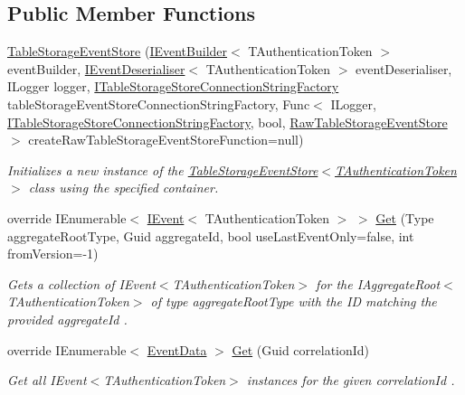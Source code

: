 \subsection*{Public Member Functions}
\begin{DoxyCompactItemize}
\item 
\hyperlink{classCqrs_1_1Azure_1_1BlobStorage_1_1Events_1_1TableStorageEventStore_a25a65bc4a027b2a16ebf02e763ac3b95_a25a65bc4a027b2a16ebf02e763ac3b95}{Table\+Storage\+Event\+Store} (\hyperlink{interfaceCqrs_1_1Events_1_1IEventBuilder}{I\+Event\+Builder}$<$ T\+Authentication\+Token $>$ event\+Builder, \hyperlink{interfaceCqrs_1_1Events_1_1IEventDeserialiser}{I\+Event\+Deserialiser}$<$ T\+Authentication\+Token $>$ event\+Deserialiser, I\+Logger logger, \hyperlink{interfaceCqrs_1_1Azure_1_1BlobStorage_1_1ITableStorageStoreConnectionStringFactory}{I\+Table\+Storage\+Store\+Connection\+String\+Factory} table\+Storage\+Event\+Store\+Connection\+String\+Factory, Func$<$ I\+Logger, \hyperlink{interfaceCqrs_1_1Azure_1_1BlobStorage_1_1ITableStorageStoreConnectionStringFactory}{I\+Table\+Storage\+Store\+Connection\+String\+Factory}, bool, \hyperlink{classCqrs_1_1Azure_1_1BlobStorage_1_1Events_1_1TableStorageEventStore_1_1RawTableStorageEventStore}{Raw\+Table\+Storage\+Event\+Store} $>$ create\+Raw\+Table\+Storage\+Event\+Store\+Function=null)
\begin{DoxyCompactList}\small\item\em Initializes a new instance of the \hyperlink{classCqrs_1_1Azure_1_1BlobStorage_1_1Events_1_1TableStorageEventStore_a25a65bc4a027b2a16ebf02e763ac3b95_a25a65bc4a027b2a16ebf02e763ac3b95}{Table\+Storage\+Event\+Store$<$\+T\+Authentication\+Token$>$} class using the specified container. \end{DoxyCompactList}\item 
override I\+Enumerable$<$ \hyperlink{interfaceCqrs_1_1Events_1_1IEvent}{I\+Event}$<$ T\+Authentication\+Token $>$ $>$ \hyperlink{classCqrs_1_1Azure_1_1BlobStorage_1_1Events_1_1TableStorageEventStore_a420c94c86d8d1c2959aee8602f43c0c0_a420c94c86d8d1c2959aee8602f43c0c0}{Get} (Type aggregate\+Root\+Type, Guid aggregate\+Id, bool use\+Last\+Event\+Only=false, int from\+Version=-\/1)
\begin{DoxyCompactList}\small\item\em Gets a collection of I\+Event$<$\+T\+Authentication\+Token$>$ for the I\+Aggregate\+Root$<$\+T\+Authentication\+Token$>$ of type {\itshape aggregate\+Root\+Type}  with the ID matching the provided {\itshape aggregate\+Id} . \end{DoxyCompactList}\item 
override I\+Enumerable$<$ \hyperlink{classCqrs_1_1Events_1_1EventData}{Event\+Data} $>$ \hyperlink{classCqrs_1_1Azure_1_1BlobStorage_1_1Events_1_1TableStorageEventStore_a9b952a9257dc6f458b98eba87684412e_a9b952a9257dc6f458b98eba87684412e}{Get} (Guid correlation\+Id)
\begin{DoxyCompactList}\small\item\em Get all I\+Event$<$\+T\+Authentication\+Token$>$ instances for the given {\itshape correlation\+Id} . \end{DoxyCompactList}\end{DoxyCompactItemize}
